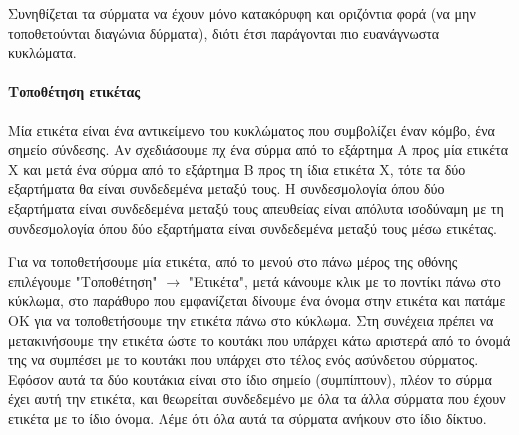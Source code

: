 \documentclass[a4paper]{article}
\begin{document}
Συνηθίζεται τα σύρματα να έχουν μόνο κατακόρυφη και οριζόντια φορά (να μην τοποθετούνται διαγώνια δύρματα), διότι έτσι παράγονται πιο ευανάγνωστα κυκλώματα.

\begin{figure}
  \begin{center}
    \label{fig:kicad-main}
  \end{center}
\end{figure}

\begin{figure}
  \begin{center}
    \label{fig:kicad-main}
  \end{center}
\end{figure}
   
\begin{figure}
  \begin{center}
    \label{fig:kicad-main}
  \end{center}
\end{figure}

\paragraph{Τοποθέτηση ετικέτας}
Μία ετικέτα είναι ένα αντικείμενο του κυκλώματος που συμβολίζει έναν κόμβο, ένα σημείο σύνδεσης. Αν σχεδιάσουμε πχ ένα σύρμα από το εξάρτημα Α προς μία ετικέτα Χ και μετά ένα σύρμα από το εξάρτημα Β προς τη ίδια ετικέτα Χ, τότε τα δύο εξαρτήματα θα είναι συνδεδεμένα μεταξύ τους. Η συνδεσμολογία όπου δύο εξαρτήματα είναι συνδεδεμένα μεταξύ τους απευθείας είναι απόλυτα ισοδύναμη με τη συνδεσμολογία όπου δύο εξαρτήματα είναι συνδεδεμένα μεταξύ τους μέσω ετικέτας.

Για να τοποθετήσουμε μία ετικέτα, από το μενού στο πάνω μέρος της οθόνης επιλέγουμε "Τοποθέτηση" $\rightarrow$ "Ετικέτα", μετά κάνουμε κλικ με το ποντίκι πάνω στο κύκλωμα, στο παράθυρο που εμφανίζεται δίνουμε ένα όνομα στην ετικέτα και πατάμε ΟΚ για να τοποθετήσουμε την ετικέτα πάνω στο κύκλωμα. Στη συνέχεια πρέπει να μετακινήσουμε την ετικέτα ώστε το κουτάκι που υπάρχει κάτω αριστερά από το όνομά της να συμπέσει με το κουτάκι που υπάρχει στο τέλος ενός ασύνδετου σύρματος. Εφόσον αυτά τα δύο κουτάκια είναι στο ίδιο σημείο (συμπίπτουν), πλέον το σύρμα έχει αυτή την ετικέτα, και θεωρείται συνδεδεμένο με όλα τα άλλα σύρματα που έχουν ετικέτα με το ίδιο όνομα. Λέμε ότι όλα αυτά τα σύρματα ανήκουν στο ίδιο δίκτυο.
\end{document}
